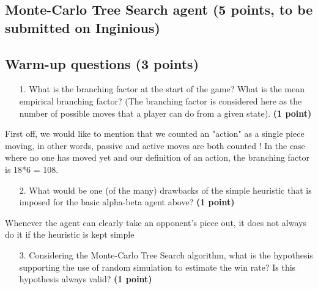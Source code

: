 \documentclass[11pt,a4paper]{report}
\begin{document}
\subsection{Monte-Carlo Tree Search agent (5 points, to be submitted on Inginious)}
\medskip


\subsection{Warm-up questions (3 points)}
\begin{enumerate}
\item[1.] What is the branching factor at the start of the game? What is the mean empirical branching factor? (The branching factor is considered here as the number of possible moves that a player can do from a given state). \textbf{(1 point)}
\end{enumerate}

\begin{answers}[5cm]
    First off, we would like to mention that we counted an "action" as a single piece moving, in other words, passive and active moves are both counted ! 
    In the case where no one has moved yet and our definition of an action, the branching factor is 18*6 = 108.
\end{answers}



\begin{enumerate}
\item[2.] What would be one (of the many) drawbacks of the simple heuristic that is imposed for the basic alpha-beta agent above? \textbf{(1 point)}
\end{enumerate}

\begin{answers}[10cm]
    Whenever the agent can clearly take an opponent's piece out, it does not always do it if the heuristic is kept simple
\end{answers}



\begin{enumerate}
\item[3.] Considering the Monte-Carlo Tree Search algorithm, what is the hypothesis supporting the use of random simulation to estimate the win rate? Is this hypothesis always valid? \textbf{(1 point)}
\end{enumerate}
\end{document}
